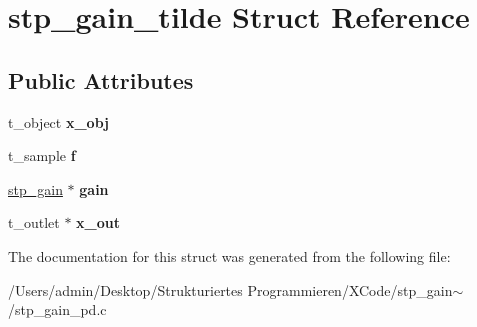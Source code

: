 \hypertarget{structstp__gain__tilde}{}\section{stp\+\_\+gain\+\_\+tilde Struct Reference}
\label{structstp__gain__tilde}
\subsection*{Public Attributes}
\begin{DoxyCompactItemize}
\item 
\mbox{\label{structstp__gain__tilde_a289b6d4534ae8b4715262a7d56ee477e}} 
t\+\_\+object {\bfseries x\+\_\+obj}
\item 
\mbox{\label{structstp__gain__tilde_a8fe959dabdadd9143d0a85c51e74e16f}} 
t\+\_\+sample {\bfseries f}
\item 
\mbox{\label{structstp__gain__tilde_a3f52d05f596d6b79065ad274a458c565}} 
\hyperlink{structstp__gain}{stp\+\_\+gain} $\ast$ {\bfseries gain}
\item 
\mbox{\label{structstp__gain__tilde_ab0b55cadacd74c6afa42da908011afab}} 
t\+\_\+outlet $\ast$ {\bfseries x\+\_\+out}
\end{DoxyCompactItemize}


The documentation for this struct was generated from the following file\+:\begin{DoxyCompactItemize}
\item 
/\+Users/admin/\+Desktop/\+Strukturiertes Programmieren/\+X\+Code/stp\+\_\+gain$\sim$/stp\+\_\+gain\+\_\+pd.\+c\end{DoxyCompactItemize}
